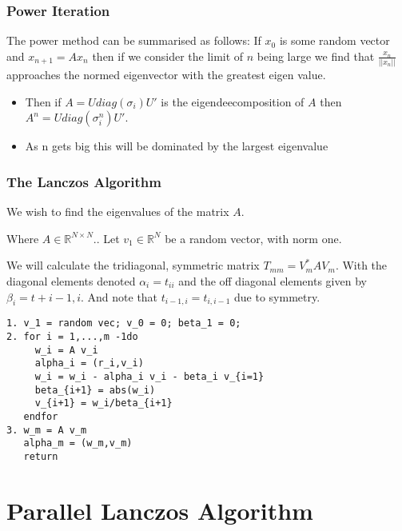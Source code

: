 \documentclass[pdf]{beamer}
\begin{document}
\begin{frame}
\frametitle{Power Iteration}

The power method can be summarised as follows: If $x_0$ is some random vector and $x_{n+1}=A x_n$ then if we consider the limit of $n$ being large we find that $\frac{x_n}{||x_n||}$ approaches the normed eigenvector with the greatest eigen value. 
\begin{itemize}
\item Then if $A=U {diag} (\sigma_i) U'$ is the eigendeecomposition of $A$ then $A^n = U {diag}(\sigma^n_i) U'$.
\item As n gets big this will be dominated by the largest eigenvalue
\end{itemize}
\end{frame}



\begin{frame}
\frametitle{The Lanczos Algorithm}

We wish to find the eigenvalues of the matrix $A$.

Where $A \in \mathbb{R}^{N \times N}$.. Let $v_1 \in \mathbb{R}^N$ be a random vector, with norm one.

We will calculate the tridiagonal, symmetric matrix $T_{mm} = V_m^* A V_m$. With the diagonal elements denoted $\alpha_i=t_{ii}$ and the off diagonal elements given by $\beta_i = t+{i-1,i}$. And note that $t_{i-1,i}=t_{i,i-1}$ due to symmetry.



\end{frame}


\begin{frame}[fragile]

\begin{verbatim}
1. v_1 = random vec; v_0 = 0; beta_1 = 0;
2. for i = 1,...,m -1do
     w_i = A v_i
     alpha_i = (r_i,v_i)
     w_i = w_i - alpha_i v_i - beta_i v_{i=1}
     beta_{i+1} = abs(w_i)
     v_{i+1} = w_i/beta_{i+1}
   endfor
3. w_m = A v_m
   alpha_m = (w_m,v_m)
   return
\end{verbatim}



\end{frame}





\section{Parallel Lanczos Algorithm}
\end{document}
